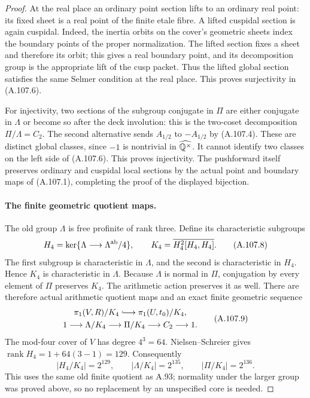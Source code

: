 \begin{proof}
At the real place an ordinary point section lifts
to an ordinary real point: its fixed sheet is a
real point of the finite etale fibre.
A lifted cuspidal section is again cuspidal.
Indeed, the inertia orbits on the cover's geometric
sheets index the boundary points of the proper
normalization.  The lifted section fixes a sheet
and therefore its orbit; this gives a real boundary
point, and its decomposition group is the appropriate
lift of the cusp packet.
Thus the lifted global section satisfies the same
Selmer condition at the real place.
This proves surjectivity in (A.107.6).

For injectivity, two sections of the subgroup
conjugate in $\Pi$ are either conjugate in $\Lambda$
or become so after the deck involution: this is
the two-coset decomposition $\Pi/\Lambda=C_2$.
The second alternative sends $A_{1/2}$ to
$-A_{1/2}$ by (A.107.4).
These are distinct global classes, since $-1$ is
nontrivial in $\widehat{\mathbb Q^\times}$.
It cannot identify two classes on the left side
of (A.107.6).  This proves injectivity.
The pushforward itself preserves ordinary and
cuspidal local sections by the actual point and
boundary maps of (A.107.1), completing the proof of
the displayed bijection.

\paragraph{The finite geometric quotient maps.}
The old group $\Lambda$ is free profinite of rank three.
Define its characteristic subgroups
\[
 H_4=\ker\{\Lambda\longrightarrow\Lambda^{\rm ab}/4\},
                 \qquad K_4=\overline{H_4^2[H_4,H_4]}.
 \tag{A.107.8}
\]
The first subgroup is characteristic in $\Lambda$,
and the second is characteristic in $H_4$.
Hence $K_4$ is characteristic in $\Lambda$.
Because $\Lambda$ is normal in $\Pi$, conjugation
by every element of $\Pi$ preserves $K_4$.
The arithmetic action preserves it as well.
There are therefore actual arithmetic quotient maps
and an exact finite geometric sequence
\[
 \begin{gathered}
 \pi_1(V,R)/K_4\lhook\joinrel\longrightarrow
                      \pi_1(U,t_0)/K_4,\\
 1\longrightarrow\Lambda/K_4
       \longrightarrow\Pi/K_4
       \longrightarrow C_2\longrightarrow1.
 \end{gathered}
 \tag{A.107.9}
\]
The mod-four cover of $V$ has degree $4^3=64$.
Nielsen--Schreier gives
$\operatorname{rank}H_4=1+64(3-1)=129$.
Consequently
\[
 |H_4/K_4|=2^{129},\qquad
 |\Lambda/K_4|=2^{135},\qquad
                         |\Pi/K_4|=2^{136}.
 \tag{A.107.10}
\]
This uses the same old finite quotient as A.93;
normality under the larger group was proved above,
so no replacement by an unspecified core is needed.


\end{proof}
